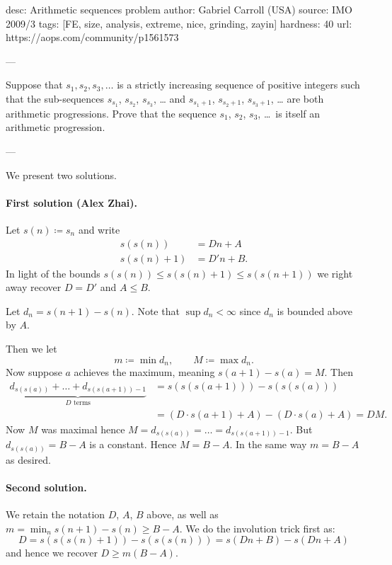 desc: Arithmetic sequences problem
author: Gabriel Carroll (USA)
source:  IMO 2009/3
tags:  [FE, size, analysis, extreme, nice, grinding, zayin]
hardness: 40
url: https://aops.com/community/p1561573

---

Suppose that $s_1,s_2,s_3, \dotsc$ is a strictly increasing sequence of
positive integers such that the sub-sequences
$s_{s_1}$, $s_{s_2}$, $s_{s_3}$, \dots
and $s_{s_1 + 1}$, $s_{s_2 + 1}$, $s_{s_3 + 1}$, \dots
are both arithmetic progressions.
Prove that the sequence $s_1$, $s_2$, $s_3$, \dots\ is itself an arithmetic progression.

---

We present two solutions.

\paragraph{First solution (Alex Zhai).}
Let $s(n) \coloneqq s_n$ and write
\begin{align*}
  s(s(n)) &= Dn + A \\
  s(s(n)+1) &= D'n + B.
\end{align*}
In light of the bounds $s(s(n)) \le s(s(n)+1) \le s(s(n+1))$
we right away recover $D = D'$ and $A \le B$.

Let $d_n = s(n+1)-s(n)$.
Note that $\sup d_n < \infty$ since $d_n$ is bounded above by $A$.

Then we let
\[ m \coloneqq \min d_n, \qquad M \coloneqq \max d_n. \]
Now suppose $a$ achieves the maximum, meaning $s(a+1)-s(a) = M$.
Then
\begin{align*}
  \underbrace{d_{s(s(a))} + \dots + d_{s(s(a+1))-1}}_{D \text{ terms}}
  &= \boxed{s(s(s(a+1))) - s(s(s(a)))} \\
  &= (D \cdot s(a+1) + A) - (D \cdot s(a) + A) = DM.
\end{align*}
Now $M$ was maximal hence $M = d_{s(s(a))} = \dots = d_{s(s(a+1))-1}$.
But $d_{s(s(a))} = B-A$ is a constant.
Hence $M = B-A$.
In the same way $m = B-A$ as desired.

\paragraph{Second solution.}
We retain the notation $D$, $A$, $B$ above,
as well as $m = \min_n s(n+1)-s(n) \ge B-A$.
We do the involution trick first as:
\[ D = \boxed{s(s(s(n)+1)) - s(s(s(n)))} = s(Dn+B) - s(Dn+A) \]
and hence we recover $D \ge m(B-A)$.

